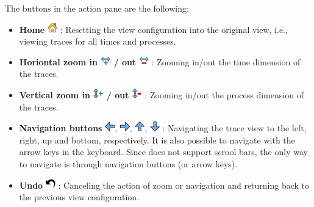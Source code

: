 The buttons in the action pane are the following:
\begin{itemize}

\item \textbf{Home} \includegraphics[scale=.5]{fig/hpctraceviewer-button-home-screen.png} : Resetting the view configuration into the original view, i.e., viewing traces for all times and processes.
\item \textbf{Horiontal zoom in \includegraphics{fig/hpctraceviewer-button-zoom-in-time.png} / out }\includegraphics{fig/hpctraceviewer-button-zoom-out-time.png} : Zooming in/out the time dimension of the traces. 
\item \textbf{Vertical zoom in \includegraphics[scale=.5]{fig/hpctraceviewer-button-zoom-in-process.png} / out \includegraphics[scale=.5]{fig/hpctraceviewer-button-zoom-out-process.png} }: Zooming in/out the process dimension of the traces.
\item \textbf{Navigation buttons} \includegraphics[scale=.5]{fig/hpctraceviewer-button-go-east.png}, \includegraphics[scale=.5]{fig/hpctraceviewer-button-go-west.png}, \includegraphics[scale=.5]{fig/hpctraceviewer-button-go-north.png}, \includegraphics[scale=.5]{fig/hpctraceviewer-button-go-south.png} : Navigating the trace view to the left, right, up and bottom, respectively. It is also possible to navigate with the arrow keys in the keyboard. Since \traceview{} does not support scrool bars, the only way to navigate is through navigation buttons (or arrow keys).
\item \textbf{Undo} \includegraphics[scale=.5]{fig/hpctraceviewer-button-undo.png} : Canceling the action of zoom or navigation and returning back to the previous view configuration.

\end{itemize}
